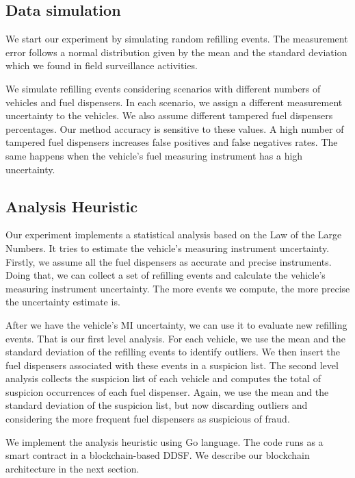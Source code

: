 \documentclass[sigplan]{acmart}
\begin{document}
\subsection{Data simulation}
We start our experiment by simulating random refilling events.
The measurement error follows a normal distribution given by the mean and the standard deviation which we found in field surveillance activities.

We simulate refilling events considering scenarios with different numbers of vehicles and fuel dispensers.
In each scenario, we assign a different measurement uncertainty to the vehicles.
We also assume different tampered fuel dispensers percentages.
Our method accuracy is sensitive to these values.
A high number of tampered fuel dispensers increases false positives and false negatives rates.
The same happens when the vehicle's fuel measuring instrument has a high uncertainty.

\subsection{Analysis Heuristic}
Our experiment implements a statistical analysis based on the Law of the Large Numbers.
It tries to estimate the vehicle's measuring instrument uncertainty.
Firstly, we assume all the fuel dispensers as accurate and precise instruments.
Doing that, we can collect a set of refilling events and calculate the vehicle's measuring instrument uncertainty.
The more events we compute, the more precise the uncertainty estimate is.

After we have the vehicle's MI uncertainty, we can use it to evaluate new refilling events.
That is our first level analysis.
For each vehicle, we use the mean and the standard deviation of the refilling events to identify outliers.
We then insert the fuel dispensers associated with these events in a suspicion list.
The second level analysis collects the suspicion list of each vehicle and computes the total of suspicion occurrences of each fuel dispenser.
Again, we use the mean and the standard deviation of the suspicion list, but now discarding outliers and considering the more frequent fuel dispensers as suspicious of fraud.

We implement the analysis heuristic using Go language.
The code runs as a smart contract in a blockchain-based DDSF.
We describe our blockchain architecture in the next section.
\end{document}
